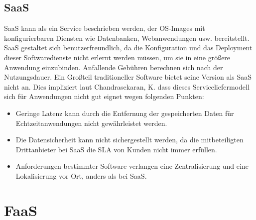 \documentclass[
12pt,
english,
ngerman,
headsepline,
twoside,
openright,
numbers=noenddot,version=first
]{scrreprt}
\begin{document}
\section{SaaS} 
\label{sec:saas}
\acrfull{SaaS} kann als ein Service beschrieben werden, der OS-Images mit konfigurierbaren Diensten wie Datenbanken, Webanwendungen usw. bereitstellt. \acrshort{SaaS} gestaltet sich benutzerfreundlich, da die Konfiguration und das Deployment dieser Softwaredienste nicht erlernt werden müssen, um sie in eine größere Anwendung einzubinden. Anfallende Gebühren berechnen sich nach der Nutzungsdauer.
Ein Großteil traditioneller Software bietet seine Version als \acrshort{SaaS} nicht an. Dies impliziert laut Chandrasekaran, K. dass dieses Serviceliefermodell sich für Anwendungen nicht gut eignet wegen folgenden Punkten:
\begin{itemize}
	\item Geringe Latenz kann durch die Entfernung der gespeicherten Daten für Echtzeitanwendungen nicht gewährleistet werden.
	\item Die Datensicherheit kann nicht sichergestellt werden, da die mitbeteiligten Drittanbieter bei \acrshort{SaaS} die \acrfull{SLA} von Kunden nicht immer erfüllen.
	\item Anforderungen bestimmter Software verlangen eine Zentralisierung und eine Lokalisierung vor Ort, anders als bei \acrshort{SaaS}. 
\end{itemize}





\chapter{FaaS}%
\end{document}
